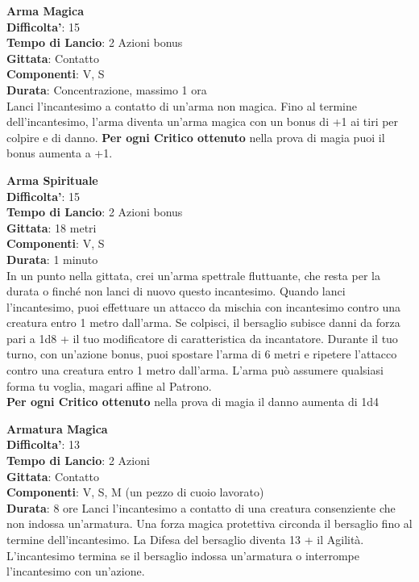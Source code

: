 \begin{multicols}{2}
\medskip\textbf{Arma Magica}\\
\textbf{Difficolta'}: 15\\
\textbf{Tempo di Lancio}: 2 Azioni bonus\\
\textbf{Gittata}: Contatto\\
\textbf{Componenti}: V, S\\
\textbf{Durata}: Concentrazione, massimo 1 ora\\
Lanci l’incantesimo a contatto di un’arma non magica. Fino al termine dell’incantesimo, l’arma diventa un’arma magica con un bonus di +1 ai tiri per colpire e di danno.
\textbf{Per ogni Critico ottenuto} nella prova di magia puoi il bonus aumenta a +1.

\medskip\textbf{Arma Spirituale}\\
\textbf{Difficolta'}: 15\\
\textbf{Tempo di Lancio}: 2 Azioni bonus\\
\textbf{Gittata}: 18 metri\\
\textbf{Componenti}: V, S\\
\textbf{Durata}: 1 minuto\\
In un punto nella gittata, crei un’arma spettrale fluttuante, che resta per la durata o finché non lanci di nuovo questo incantesimo. Quando lanci l’incantesimo, puoi effettuare un attacco da mischia con incantesimo contro una creatura entro 1 metro dall’arma. Se colpisci, il bersaglio subisce danni da forza pari a 1d8 + il tuo modificatore di caratteristica da incantatore. Durante il tuo turno, con un’azione bonus, puoi spostare l’arma di 6 metri e ripetere l’attacco contro una creatura entro 1 metro dall’arma. L’arma può assumere qualsiasi forma tu voglia, magari affine al Patrono.\\
\textbf{Per ogni Critico ottenuto} nella prova di magia il danno aumenta di 1d4

\medskip\textbf{Armatura Magica}\\
\textbf{Difficolta'}: 13\\
\textbf{Tempo di Lancio}: 2 Azioni\\
\textbf{Gittata}: Contatto\\
\textbf{Componenti}: V, S, M (un pezzo di cuoio lavorato)\\
\textbf{Durata}: 8 ore
Lanci l’incantesimo a contatto di una creatura consenziente che non indossa un’armatura. Una forza magica protettiva circonda il bersaglio fino al termine dell’incantesimo. La Difesa del bersaglio diventa 13 + il Agilità. L’incantesimo termina se il bersaglio indossa un’armatura o interrompe l’incantesimo con un’azione.



\end{multicols}
